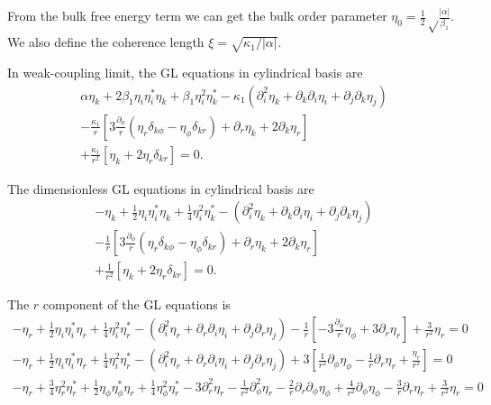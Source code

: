 \documentclass[aps,prl,preprint]{revtex4-2}
\begin{document}
From the bulk free energy term we can get the bulk order parameter
$\eta_0 = \frac{1}{2}\sqrt\frac{|\alpha|}{\beta_1}$.
We also define the coherence length $\xi = \sqrt{\kappa_1/|\alpha|}$.

In weak-coupling limit, the GL equations in cylindrical basis are
\begin{align}
    \alpha\eta_k+2\beta_1\eta_i\eta_i^*\eta_k
    +\beta_1\eta_i^2\eta_k^*
    -\kappa_1\left(\partial_i^2\eta_k
    +\partial_k\partial_i\eta_i
    +\partial_j\partial_k\eta_j\right)\nonumber\\
    -\frac{\kappa_1}{r}\left[3\frac{\partial_\phi}{r}
    \left(\eta_r\delta_{k\phi}-\eta_\phi\delta_{kr}\right)+\partial_r\eta_k
    +2\partial_k\eta_r\right]\nonumber\\
    +\frac{\kappa_1}{r^2}\left[\eta_k+2\eta_r\delta_{kr}\right]=0.
\end{align}

The dimensionless GL equations in cylindrical basis are
\begin{align}
    -\eta_k+\frac{1}{2}\eta_i\eta_i^*\eta_k
    +\frac{1}{4}\eta_i^2\eta_k^*
    -(\partial_i^2\eta_k
    +\partial_k\partial_i\eta_i
    +\partial_j\partial_k\eta_j)\nonumber\\
    -\frac{1}{r}\left[3\frac{\partial_\phi}{r}
    \left(\eta_r\delta_{k\phi}-\eta_\phi\delta_{kr}\right)+\partial_r\eta_k
    +2\partial_k\eta_r\right]\nonumber\\
    +\frac{1}{r^2}\left[\eta_k+2\eta_r\delta_{kr}\right]=0.
\end{align}

The $r$ component of the GL equations is
\begin{align}
    -\eta_r+\frac{1}{2}\eta_i\eta_i^*\eta_r
    +\frac{1}{4}\eta_i^2\eta_r^*
    -(\partial_i^2\eta_r
    +\partial_r\partial_i\eta_i
    +\partial_j\partial_r\eta_j)
    -\frac{1}{r}\left[-3\frac{\partial_\phi}{r}\eta_\phi
    +3\partial_r\eta_r\right]
    +\frac{3}{r^2}\eta_r=0 \nonumber\\
    -\eta_r+\frac{1}{2}\eta_i\eta_i^*\eta_r
    +\frac{1}{4}\eta_i^2\eta_r^*
    -(\partial_i^2\eta_r
    +\partial_r\partial_i\eta_i
    +\partial_j\partial_r\eta_j)
    +3\left[\frac{1}{r^2}\partial_\phi\eta_\phi
    -\frac{1}{r}\partial_r\eta_r + \frac{\eta_r}{r^2}\right]=0 \nonumber\\
    -\eta_r + \frac{3}{4}\eta_r^2\eta_r^*
    +\frac{1}{2}\eta_\phi\eta_\phi^*\eta_r
    +\frac{1}{4}\eta_\phi^2\eta_r^*
    -3\partial_r^2\eta_r - \frac{1}{r^2}\partial_\phi^2\eta_r
    -\frac{2}{r}\partial_r\partial_\phi\eta_\phi
    +\frac{4}{r^2}\partial_\phi\eta_\phi
    -\frac{3}{r}\partial_r\eta_r + \frac{3}{r^2}\eta_r=0 \nonumber
\end{align}
\end{document}
